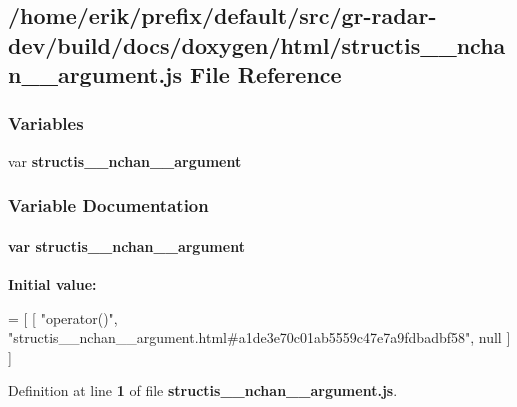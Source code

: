 \subsection{/home/erik/prefix/default/src/gr-\/radar-\/dev/build/docs/doxygen/html/structis\+\_\+\+\_\+nchan\+\_\+\+\_\+argument.js File Reference}
\label{structis____nchan____argument_8js}
\subsubsection*{Variables}
\begin{DoxyCompactItemize}
\item 
var {\bf structis\+\_\+\+\_\+nchan\+\_\+\+\_\+argument}
\end{DoxyCompactItemize}


\subsubsection{Variable Documentation}
\paragraph[{structis\+\_\+\+\_\+nchan\+\_\+\+\_\+argument}]{\setlength{\rightskip}{0pt plus 5cm}var structis\+\_\+\+\_\+nchan\+\_\+\+\_\+argument}\label{structis____nchan____argument_8js_aebed4efe46f249a5780da4f635d6fbba}
{\bfseries Initial value\+:}
\begin{DoxyCode}
=
[
    [ \textcolor{stringliteral}{"operator()"}, \textcolor{stringliteral}{"structis\_\_nchan\_\_argument.html#a1de3e70c01ab5559c47e7a9fdbadbf58"}, null ]
]
\end{DoxyCode}


Definition at line {\bf 1} of file {\bf structis\+\_\+\+\_\+nchan\+\_\+\+\_\+argument.\+js}.

